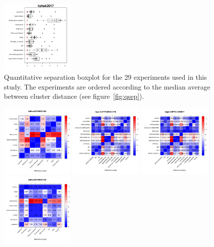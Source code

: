 \documentclass[12pt]{article}\usepackage[]{graphicx}\usepackage[]{color}
\begin{document}
\begin{appendices}
\begin{figure}[htb]
  \includegraphics[width = 0.32\textwidth]{./figure/allqseps-28.pdf}
  \caption{Quantitative separation boxplot for the 29
    experiments used in this study. The experiments are ordered
    according to the median average between cluster distance (see
    figure~\ref{fig:qsep}). }
  \ContinuedFloat
  \label{fig:allqseps}
\end{figure}

\begin{figure}[htb]
  \centering
  \includegraphics[width = 0.32\textwidth]{./figure/allhmaps-1.pdf}
  \includegraphics[width = 0.32\textwidth]{./figure/allhmaps-2.pdf}
  \includegraphics[width = 0.32\textwidth]{./figure/allhmaps-3.pdf}
  \includegraphics[width = 0.32\textwidth]{./figure/allhmaps-4.pdf}

\end{figure}
\end{appendices}
\end{document}

